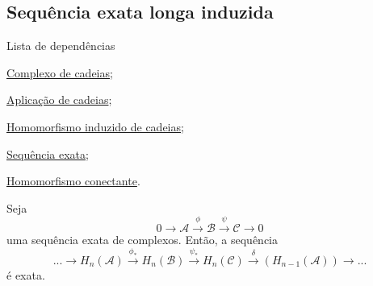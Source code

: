 \subsection{Sequência exata longa induzida} %
\label{sequencia-exata-longa-induzida-prop}
\begin{titlemize}{Lista de dependências}
	\item \hyperref[complexo-de-cadeias-def]{Complexo de cadeias};\\ 
    \item \hyperref[aplicacao-de-cadeias-def]{Aplicação de cadeias};\\
    \item \hyperref[homomorfismo-induzido-de-cadeias-prop]{Homomorfismo induzido de cadeias};\\
    \item \hyperref[sequencia-exata-def]{Sequência exata};\\
    \item \hyperref[homomorfismo-conectante-def]{Homomorfismo conectante}.
\end{titlemize}

\begin{thm}
    Seja 
    \[0\rightarrow \mathcal{A}\xrightarrow{\phi} \mathcal{B}\xrightarrow{\psi} \mathcal{C}\rightarrow 0\]
    uma sequência exata de complexos. Então, a sequência 
    \[...\rightarrow H_n(\mathcal{A})\xrightarrow{\phi_*}H_n(\mathcal{B})\xrightarrow{\psi_*} H_n (\mathcal{C})\xrightarrow{\delta}(H_{n-1}(\mathcal{A}))\rightarrow...\]
    é exata.
\end{thm}


